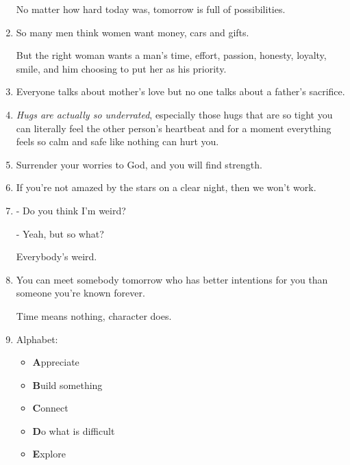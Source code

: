 \documentclass{article}
\begin{document}
\begin{enumerate}
	No matter how hard today was, tomorrow is full of possibilities.
	\item So many men think women want money, cars and gifts.
	
	But the right woman wants a man's time, effort, passion, honesty, loyalty, smile, and him choosing to put her as his priority.
	\item Everyone talks about mother's love but no one talks about a father's sacrifice.
	\item \textit{Hugs are actually so underrated}, especially those hugs that are so tight you can literally feel the other person's heartbeat and for a moment everything feels so calm and safe like nothing can hurt you.
	\item Surrender your worries to God, and you will find strength.
	\item If you're not amazed by the stars on a clear night, then we won't work.
	\item - Do you think I'm weird?
	
	- Yeah, but so what?
	
	Everybody's weird.
	\item You can meet somebody tomorrow who has better intentions for you than someone you're known forever.
	
	Time means nothing, character does.
	\item Alphabet:
	\begin{itemize}
		\item \textbf{A}ppreciate
		\item \textbf{B}uild something
		\item \textbf{C}onnect
		\item \textbf{D}o what is difficult
		\item \textbf{E}xplore
		

\end{itemize}
\end{enumerate}
\end{document}
